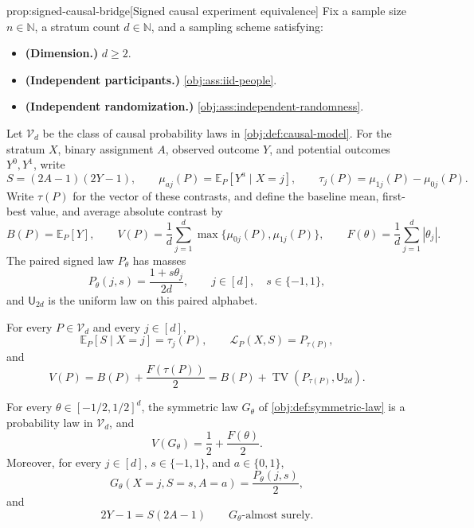 \documentclass[11pt]{article}
\begin{document}
\begin{propositionv}{prop:signed-causal-bridge}[Signed causal experiment equivalence]
Fix a sample size \(n\in\mathbb N\), a stratum count \(d\in\mathbb N\), and a sampling scheme satisfying:
\begin{itemize}
\item \textbf{(Dimension.)} \(d\ge 2\).
\item \textbf{(Independent participants.)} \cref{obj:ass:iid-people}.
\item \textbf{(Independent randomization.)} \cref{obj:ass:independent-randomness}.
\end{itemize}
Let \(\mathcal V_d\) be the class of causal probability laws in \cref{obj:def:causal-model}. For the stratum \(X\), binary assignment \(A\), observed outcome \(Y\), and potential outcomes \(Y^0,Y^1\), write
\[
S=(2A-1)(2Y-1),\qquad
\mu_{aj}(P)=\mathbb E_P[Y^a\mid X=j],\qquad
\tau_j(P)=\mu_{1j}(P)-\mu_{0j}(P).
\]
Write \(\tau(P)\) for the vector of these contrasts, and define the baseline mean, first-best value, and average absolute contrast by
\[
B(P)=\mathbb E_P[Y],\qquad
V(P)=\frac1d\sum_{j=1}^d\max\{\mu_{0j}(P),\mu_{1j}(P)\},
\qquad
F(\theta)=\frac1d\sum_{j=1}^d|\theta_j|.
\]
The paired signed law \(P_\theta\) has masses
\[
P_\theta(j,s)=\frac{1+s\theta_j}{2d},
\qquad j\in[d],\quad s\in\{-1,1\},
\]
and \(\mathsf U_{2d}\) is the uniform law on this paired alphabet.

For every \(P\in\mathcal V_d\) and every \(j\in[d]\),
\[
\mathbb E_P[S\mid X=j]=\tau_j(P),
\qquad
\mathcal L_P(X,S)=P_{\tau(P)},
\]
and
\[
V(P)
=B(P)+\frac{F(\tau(P))}{2}
=B(P)+\operatorname{TV}(P_{\tau(P)},\mathsf U_{2d}).
\]

For every \(\theta\in[-1/2,1/2]^d\), the symmetric law \(G_\theta\) of \cref{obj:def:symmetric-law} is a probability law in \(\mathcal V_d\), and
\[
V(G_\theta)=\frac12+\frac{F(\theta)}2.
\]
Moreover, for every \(j\in[d]\), \(s\in\{-1,1\}\), and \(a\in\{0,1\}\),
\[
G_\theta(X=j,S=s,A=a)=\frac{P_\theta(j,s)}2,
\]
and
\[
2Y-1=S(2A-1)
\qquad G_\theta\text{-almost surely}.
\]


\end{propositionv}
\end{document}

